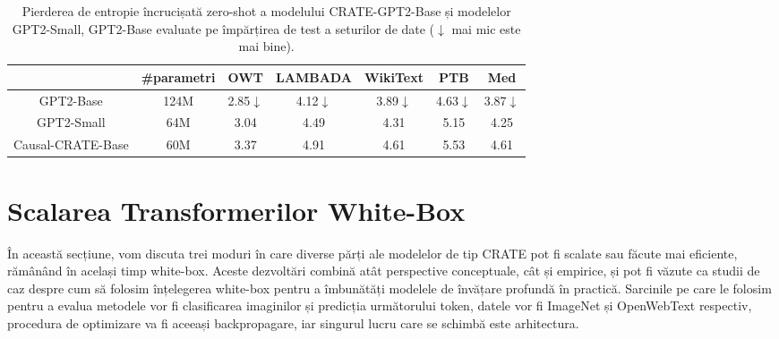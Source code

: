 \documentclass[../../book-main_ro.tex]{subfiles}
\begin{document}
\begin{table}
\def\arraystretch{1.1}
    \small
    \caption{\small Pierderea de entropie încrucișată zero-shot a modelului CRATE-GPT2-Base și modelelor GPT2-Small, GPT2-Base evaluate pe împărțirea de test a seturilor de date ($\downarrow$ mai mic este mai bine).
    }
    \centering
    \begin{tabular}{ccccccc}
    \hline
    & \#parametri & \textbf{OWT} & \textbf{LAMBADA} & \textbf{WikiText} & \textbf{PTB} & \textbf{Med} \\
     \hline
     GPT2-Base  & {124M} & 2.85$\downarrow$ & 4.12$\downarrow$ & 3.89$\downarrow$ & 4.63$\downarrow$ & 3.87$\downarrow$ \\
     {GPT2-Small } &  {64M} & {3.04} & {4.49} & {4.31} & {5.15} & {4.25} \\
     Causal-CRATE-Base & {60M} & 3.37 & 4.91 & 4.61 & 5.53 & 4.61 \\
     \hline
    \end{tabular}
    \label{tab:gpt-eval}
\end{table} 





























\section{Scalarea Transformerilor White-Box}\label{sec:scalable}

În această secțiune, vom discuta trei moduri în care diverse părți ale modelelor de tip CRATE pot fi scalate sau făcute mai eficiente, rămânând în același timp white-box. Aceste dezvoltări combină atât perspective conceptuale, cât și empirice, și pot fi văzute ca studii de caz despre cum să folosim înțelegerea white-box pentru a îmbunătăți modelele de învățare profundă în practică. Sarcinile pe care le folosim pentru a evalua metodele vor fi clasificarea imaginilor și predicția următorului token, datele vor fi ImageNet și OpenWebText respectiv, procedura de optimizare va fi aceeași backpropagare, iar singurul lucru care se schimbă este arhitectura.
\end{document}
